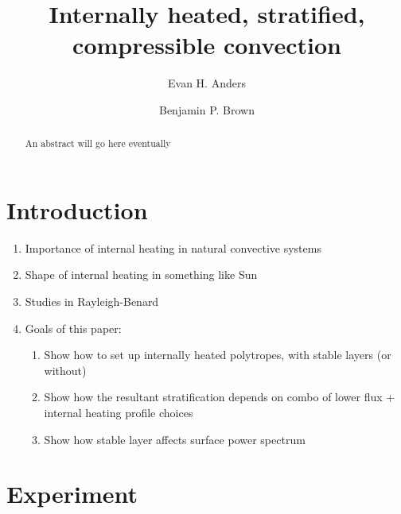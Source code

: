 \documentclass[aps, pre, onecolumn, nofootinbib, notitlepage, groupedaddress, amsfonts, amssymb, amsmath, longbibliography]{revtex4-1}
\begin{document}
\author{Evan H. Anders}
\author{Benjamin P. Brown}
\title{Internally heated, stratified, compressible convection}

\begin{abstract}
An abstract will go here eventually
\end{abstract}
\maketitle


\section{Introduction}
\label{sec:intro}
\begin{enumerate}
\item Importance of internal heating in natural convective systems
\item Shape of internal heating in something like Sun
\item Studies in Rayleigh-Benard
\item Goals of this paper:
\begin{enumerate}
\item Show how to set up internally heated polytropes, with stable layers (or without)
\item Show how the resultant stratification depends on combo of lower flux + internal heating profile choices
\item Show how stable layer affects surface power spectrum
\end{enumerate}
\end{enumerate}

\section{Experiment} 
\label{sec:experiment}
\end{document}
